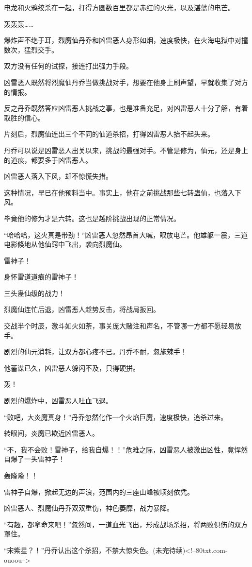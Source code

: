 \begin{this_body}
电龙和火鸦绞杀在一起，打得方圆数百里都是赤红的火光，以及湛蓝的电芒。

轰轰轰……

爆炸声不绝于耳，烈魔仙丹乔和凶雷恶人身形如烟，速度极快，在火海电狱中对撞数次，猛烈交手。

双方没有任何的试探，接连打出强力手段。

凶雷恶人既然将烈魔仙丹乔当做挑战对手，想要在他身上刷声望，早就收集了对方的情报。

反之丹乔既然答应凶雷恶人挑战之事，也是准备充足，对凶雷恶人十分了解，有着取胜的信心。

片刻后，烈魔仙连出三个不同的仙道杀招，打得凶雷恶人抬不起头来。

丹乔可以说是凶雷恶人出关以来，挑战的最强对手。不管是修为，仙元，还是身上的道痕，都要多于凶雷恶人。

凶雷恶人落入下风，却不惊慌失措。

这种情况，早已在他预料当中。事实上，他在之前挑战那些七转蛊仙，也落入下风。

毕竟他的修为才是六转。这也是越阶挑战出现的正常情况。

“哈哈哈，这火真是带劲！”凶雷恶人忽然昂首大喊，眼放电芒。他雄躯一震，三道电影倏地从他仙窍中飞出，袭向烈魔仙。

雷神子！

身怀雷道道痕的雷神子！

三头蛊仙级的战力！

烈魔仙连忙后退，凶雷恶人趁势反击，将战局扳回。

交战半个时辰，激斗如火如荼，事关庞大赌注和声名，不管哪一方都不愿轻易放手。

剧烈的仙元消耗，让双方都心疼不已。丹乔不耐，忽施辣手！

他蓄谋已久，凶雷恶人躲闪不及，只得硬拼。

轰！

剧烈的爆炸中，凶雷恶人吐血飞退。

“败吧，大炎魔真身！”丹乔忽然化作一个火焰巨魔，速度极快，追杀过来。

转眼间，炎魔已欺近凶雷恶人。

“不，我不会败！雷神子，给我自爆！！”危难之际，凶雷恶人被激出凶性，竟悍然自爆了一头雷神子！

轰隆隆！！

雷神子自爆，掀起无边的声浪，范围内的三座山峰被顷刻依凭。

凶雷恶人、烈魔仙丹乔双双重伤，神色萎靡，战力暴降。

“有趣，都拿命来吧！”忽然间，一道血光飞出，形成战场杀招，将两败俱伤的双方罩住。

“宋紫星？！”丹乔认出这个杀招，不禁大惊失色。(未完待续)<!--80txt.com-ouoou-->

\end{this_body}

